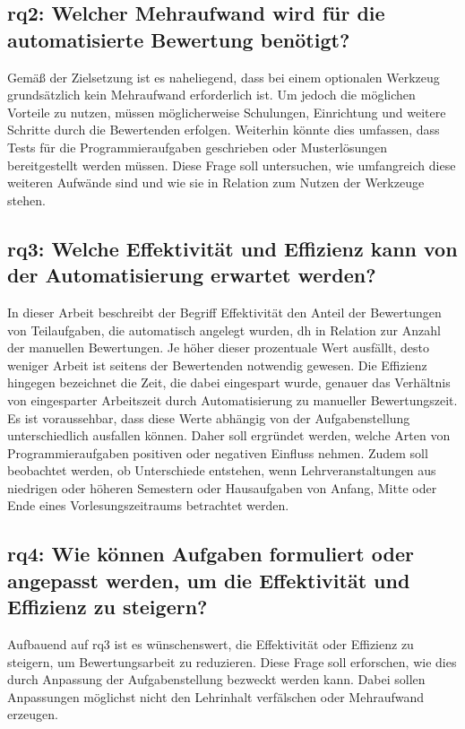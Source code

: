 \subsection[\acs{rq}2]{\ac{rq}2: Welcher Mehraufwand wird für die automatisierte Bewertung benötigt?}\label{subsec:rq2-additional-effort}

Gemäß der Zielsetzung ist es naheliegend, dass bei einem optionalen Werkzeug grundsätzlich kein Mehraufwand erforderlich ist.
Um jedoch die möglichen Vorteile zu nutzen, müssen möglicherweise Schulungen, Einrichtung und weitere Schritte durch die Bewertenden erfolgen.
Weiterhin könnte dies umfassen, dass Tests für die Programmieraufgaben geschrieben oder Musterlösungen bereitgestellt werden müssen.
Diese Frage soll untersuchen, wie umfangreich diese weiteren Aufwände sind und wie sie in Relation zum Nutzen der Werkzeuge stehen.

\subsection[\acs{rq}3]{\ac{rq}3: Welche Effektivität und Effizienz kann von der Automatisierung erwartet werden?}\label{subsec:rq3-effectivity-efficiency}

In dieser Arbeit beschreibt der Begriff Effektivität den Anteil der Bewertungen von Teilaufgaben, die automatisch angelegt wurden, \ac{dh} in Relation zur Anzahl der manuellen Bewertungen.
Je höher dieser prozentuale Wert ausfällt, desto weniger Arbeit ist seitens der Bewertenden notwendig gewesen.
Die Effizienz hingegen bezeichnet die Zeit, die dabei eingespart wurde, genauer das Verhältnis von eingesparter Arbeitszeit durch Automatisierung zu manueller Bewertungszeit.
Es ist voraussehbar, dass diese Werte abhängig von der Aufgabenstellung unterschiedlich ausfallen können.
Daher soll ergründet werden, welche Arten von Programmieraufgaben positiven oder negativen Einfluss nehmen.
Zudem soll beobachtet werden, ob Unterschiede entstehen, wenn Lehrveranstaltungen aus niedrigen oder höheren Semestern oder Hausaufgaben von Anfang, Mitte oder Ende eines Vorlesungszeitraums betrachtet werden.

\subsection[\acs{rq}4]{\ac{rq}4: Wie können Aufgaben formuliert oder angepasst werden, um die Effektivität und Effizienz zu steigern?}\label{subsec:rq4-improve-effectivity-efficiency}

Aufbauend auf \acs{rq}3 ist es wünschenswert, die Effektivität oder Effizienz zu steigern, um Bewertungsarbeit zu reduzieren.
Diese Frage soll erforschen, wie dies durch Anpassung der Aufgabenstellung bezweckt werden kann.
Dabei sollen Anpassungen möglichst nicht den Lehrinhalt verfälschen oder Mehraufwand erzeugen.

